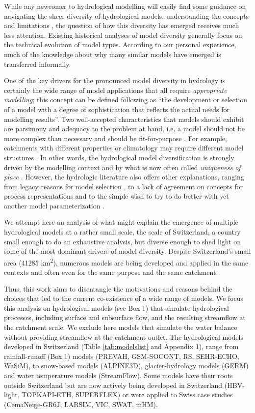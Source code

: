 \documentclass[10pt,a4paper]{article}
\begin{document}
While any newcomer to hydrological modelling will easily find some guidance on navigating the sheer diversity of hydrological models, understanding the concepts and limitations \citep{Beven2013, Solomatine2011, Kauffeldt2016}, the question of how this diversity has emerged receives much less attention. Existing historical analyses of model diversity \citep{Peel2020} generally focus on the technical evolution of model types. According to our personal experience, much of the knowledge about why many similar models have emerged is transferred informally.

One of the key drivers for the pronounced model diversity in hydrology is certainly the wide range of model applications \citep{Weiler2015} that all require \textit{appropriate modelling}; this concept can be defined following \citet{Rosbjerg2005} as ``the development or selection of a model with a degree of sophistication that reflects the actual needs for modelling results''. Two well-accepted characteristics that models should exhibit are parsimony and adequacy to the problem at hand, i.e. a model should not be more complex than necessary and should be fit-for-purpose \citep{Beven2013}. For example, catchments with different properties or climatology may require different model structures \citep{Kavetski2011, vanEsse2013}. In other words, the hydrological model diversification is strongly driven by the modelling context and by what is now often called \textit{uniqueness of place} \citep{Beven2000}. However, the hydrologic literature also offers other explanations, ranging from legacy reasons for model selection \citep{Addor2019}, to a lack of agreement on concepts for process representations and to the simple wish to try to do better with yet another model parameterization \citep{Weiler2015}.

We attempt here an analysis of what might explain the emergence of multiple hydrological models at a rather small scale, the scale of Switzerland, a country small enough to do an exhaustive analysis, but diverse enough to shed light on some of the most dominant drivers of model diversity. Despite Switzerland's small area (41285 km\textsuperscript{2}), numerous models are being developed and applied in the same contexts and often even for the same purpose and the same catchment. 

Thus, this work aims to disentangle the motivations and reasons behind the choices that led to the current co-existence of a wide range of models. We focus this analysis on hydrological models (see Box 1) that simulate hydrological processes, including surface and subsurface flow, and the resulting streamflow at the catchment scale. We exclude here models that simulate the water balance without providing streamflow at the catchment outlet. The hydrological models developed in Switzerland (Table \ref{tab:modelslist} and Appendix 1), range from rainfall-runoff (Box 1) models (PREVAH, GSM-SOCONT, RS, SEHR-ECHO, WaSiM), to snow-based models (ALPINE3D), glacier-hydrology models (GERM) and water temperature models (StreamFlow). Some models have their roots outside Switzerland but are now actively being developed in Switzerland (HBV-light, TOPKAPI-ETH, SUPERFLEX) or were applied to Swiss case studies (CemaNeige-GR6J, LARSIM, VIC, SWAT, mHM).
\end{document}
